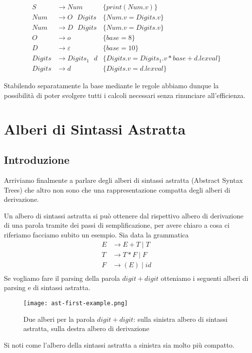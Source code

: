 \documentclass[class=book, crop=false, oneside, 12pt]{standalone}
\begin{document}
\begin{align*}
    S &\to Num &\{print(Num.v)\}\\
    Num &\to O \textrm{ } Digits &\{Num.v = Digits.v\}\\
    Num &\to D \textrm{ } Digits &\{Num.v = Digits.v\}\\
    O &\to o &\{base = 8\}\\ 
    D &\to \varepsilon &\{base = 10\}\\
    Digits &\to Digits_1 \textrm{ } d &\{Digits.v = Digits_1.v * base + d.lexval\}\\
    Digits &\to d &\{Digits.v = d.lexval\}
\end{align*}

Stabilendo separatamente la base mediante le regole abbiamo dunque la possibilità di poter svolgere tutti i calcoli necessari senza rinunciare all'efficienza. 

\section{Alberi di Sintassi Astratta}
\subsection{Introduzione}
Arriviamo finalmente a parlare degli alberi di sintassi astratta (Abstract Syntax Trees) che altro non sono che una rappresentazione compatta degli alberi di derivazione.

Un albero di sintassi astratta si può ottenere dal rispettivo albero di derivazione di una parola tramite dei passi di semplificazione, per avere chiaro a cosa ci riferiamo facciamo subito un esempio.
Sia data la grammatica
\begin{align*}
    E &\to E+T \mid T \\
    T &\to T*F \mid F \\
    F &\to (E) \mid id \\
\end{align*}
Se vogliamo fare il parsing della parola \(digit+digit\) otteniamo i seguenti alberi di parsing e di sintassi astratta.
\begin{figure}[H]
    \centering
    \texttt{[image: ast-first-example.png]}
    \caption{Due alberi per la parola \(digit+digit\): sulla sinistra albero di sintassi astratta, sulla destra albero di derivazione}
    \label{fig:ast-first-example}
\end{figure}
Si noti come l'albero della sintassi astratta a sinistra sia molto più compatto.
\end{document}
